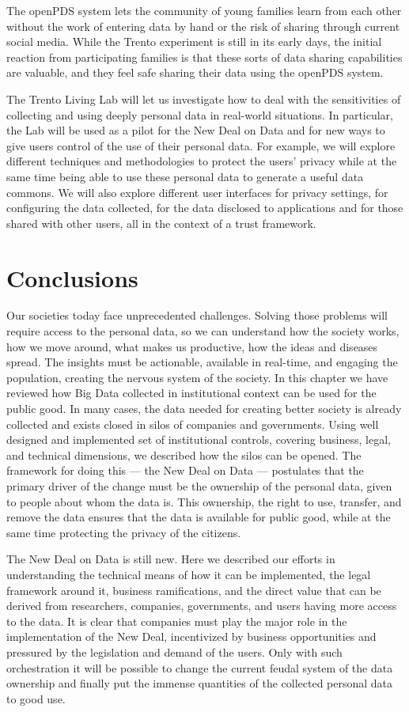 The openPDS system lets the community of young families learn from each other without the work of entering data by hand or the risk of sharing through current social media.
While the Trento experiment is still in its early days, the initial reaction from participating families is that these sorts of data sharing capabilities are valuable, and they feel safe sharing their data using the openPDS system.

The Trento Living Lab will let us investigate how to deal with the sensitivities of collecting and using deeply personal data in real-world situations.
In particular, the Lab will be used as a pilot for the New Deal on Data and for new ways to give users control of the use of their personal data.
For example, we will explore different techniques and methodologies to protect the users’ privacy while at the same time being able to use these personal data to generate a useful data commons. 
We will also explore different user interfaces for privacy settings, for configuring the data collected, for the data disclosed to applications and for those shared with other users, all in the context of a trust framework.

\section{Conclusions}

Our societies today face unprecedented challenges.
Solving those problems will require access to the personal data, so we can understand how the society works, how we move around, what makes us productive, how the ideas and diseases spread.
The insights must be actionable, available in real-time, and engaging the population, creating the nervous system of the society.
In this chapter we have reviewed how Big Data collected in institutional context can be used for the public good.
In many cases, the data needed for creating better society is already collected and exists closed in silos of companies and governments.
Using well designed and implemented set of institutional controls, covering business, legal, and technical dimensions, we described how the silos can be opened.
The framework for doing this --- the New Deal on Data --- postulates that the primary driver of the change must be the ownership of the personal data, given to people about whom the data is.
This ownership, the right to use, transfer, and remove the data ensures that the data is available for public good, while at the same time protecting the privacy of the citizens.

The New Deal on Data is still new.
Here we described our efforts in understanding the technical means of how it can be implemented, the legal framework around it, business ramifications, and the direct value that can be derived from researchers, companies, governments, and users having more access to the data.
It is clear that companies must play the major role in the implementation of the New Deal, incentivized by business opportunities and pressured by the legislation and demand of the users.
Only with such orchestration it will be possible to change the current feudal system of the data ownership and finally put the immense quantities of the collected personal data to good use. 
